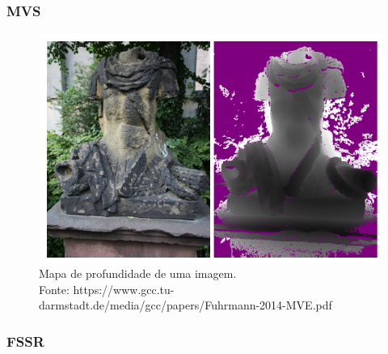 \documentclass[table, usenames, svgnames, xcolor=dvipsnames]{beamer}
\begin{document}

\begin{frame}
\frametitle{\textbf{MVS}}
	\begin{center}
		\begin{figure}
			\centering
			\includegraphics[width=0.8\linewidth]{figs/mvedepth.png}
			\caption{
			Mapa de profundidade de uma imagem. \\
			\tiny{Fonte: https://www.gcc.tu-darmstadt.de/media/gcc/papers/Fuhrmann-2014-MVE.pdf}
			}
		\end{figure}
	 	
	\end{center}
\end{frame}

\subsubsection{FSSR}
\end{document}
